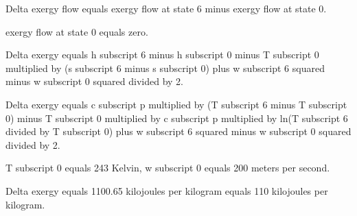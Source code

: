Delta exergy flow equals exergy flow at state 6 minus exergy flow at state 0.  

exergy flow at state 0 equals zero.  

Delta exergy equals h subscript 6 minus h subscript 0 minus T subscript 0 multiplied by (s subscript 6 minus s subscript 0) plus w subscript 6 squared minus w subscript 0 squared divided by 2.  

Delta exergy equals c subscript p multiplied by (T subscript 6 minus T subscript 0) minus T subscript 0 multiplied by c subscript p multiplied by ln(T subscript 6 divided by T subscript 0) plus w subscript 6 squared minus w subscript 0 squared divided by 2.  

T subscript 0 equals 243 Kelvin, w subscript 0 equals 200 meters per second.  

Delta exergy equals 1100.65 kilojoules per kilogram equals 110 kilojoules per kilogram.